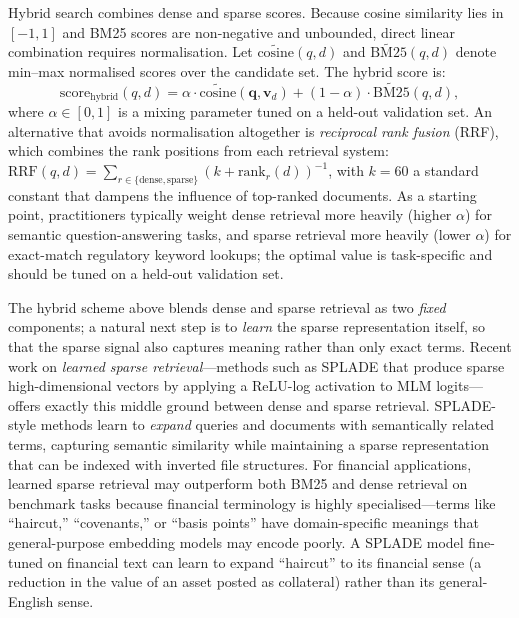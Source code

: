 \begin{deepdive}
Hybrid search combines dense and sparse scores. Because cosine similarity lies in
$[-1, 1]$ and BM25 scores are non-negative and unbounded, direct linear combination
requires normalisation. Let $\widetilde{\text{cosine}}(q, d)$ and
$\widetilde{\text{BM25}}(q, d)$ denote min--max normalised scores over the candidate
set. The hybrid score is:
\begin{equation}
  \text{score}_{\text{hybrid}}(q, d) = \alpha \cdot \widetilde{\text{cosine}}(\mathbf{q}, \mathbf{v}_d)
  + (1 - \alpha) \cdot \widetilde{\text{BM25}}(q, d),
  \label{eq:hybrid-search}
\end{equation}
where $\alpha \in [0, 1]$ is a mixing parameter tuned on a held-out validation set.
An alternative that avoids normalisation altogether is \emph{reciprocal rank fusion}
(RRF), which combines the rank positions from each retrieval system: $\text{RRF}(q,d)
= \sum_{r \in \{\text{dense},\text{sparse}\}} (k + \text{rank}_r(d))^{-1}$, with
$k = 60$ a standard constant that dampens the influence of top-ranked documents.
As a starting point, practitioners typically weight dense retrieval more heavily (higher $\alpha$) for semantic question-answering tasks, and sparse retrieval more heavily (lower $\alpha$) for exact-match regulatory keyword lookups; the optimal value is task-specific and should be tuned on a held-out validation set.

The hybrid scheme above blends dense and sparse retrieval as two \emph{fixed} components;
a natural next step is to \emph{learn} the sparse representation itself, so that the
sparse signal also captures meaning rather than only exact terms. Recent work on
\emph{learned sparse retrieval}---methods such as SPLADE that produce
sparse high-dimensional vectors by applying a ReLU-log activation to MLM logits---
offers exactly this middle ground between dense and sparse retrieval. SPLADE-style methods learn
to \emph{expand} queries and documents with semantically related terms, capturing
semantic similarity while maintaining a sparse representation that can be indexed with
inverted file structures. For financial applications, learned sparse retrieval may
outperform both BM25 and dense retrieval on benchmark tasks because financial terminology
is highly specialised---terms like ``haircut,'' ``covenants,'' or ``basis points'' have
domain-specific meanings that general-purpose embedding models may encode poorly.
A SPLADE model fine-tuned on financial text can learn to expand ``haircut'' to its
financial sense (a reduction in the value of an asset posted as collateral) rather than
its general-English sense.


\end{deepdive}
